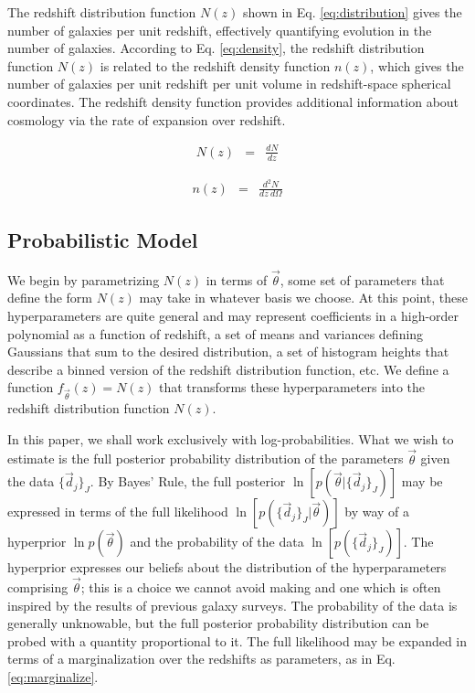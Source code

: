 \documentclass[preprint]{aastex}
\begin{document}
The redshift distribution function $N(z)$ shown in Eq. \ref{eq:distribution} 
gives the number of galaxies per unit redshift, effectively quantifying 
evolution in the number of galaxies.  \citep{Menard2013}  According to Eq. 
\ref{eq:density}, the redshift distribution function $N(z)$ is related to the 
redshift density function $n(z)$, which gives the number of galaxies per unit 
redshift per unit volume in redshift-space spherical coordinates.  The redshift 
density function provides additional information about cosmology via the rate 
of expansion over redshift.

\begin{eqnarray}
\label{eq:distribution}
N(z) &=& \frac{dN}{dz}
\end{eqnarray}

\begin{eqnarray}
\label{eq:density}
n(z) &=& \frac{d^{2}N}{dz\ d\Omega}
\end{eqnarray}

\clearpage
\subsection{Probabilistic Model}
\label{sec:prob}

We begin by parametrizing $N(z)$ in terms of $\vec{\theta}$, some set of 
parameters that define the form $N(z)$ may take in whatever basis we choose.  
At this point, these hyperparameters are quite general and may represent 
coefficients in a high-order polynomial as a function of redshift, a set of 
means and variances defining Gaussians that sum to the desired distribution, a 
set of histogram heights that describe a binned version of the redshift 
distribution function, etc.  We define a function $f_{\vec{\theta}}(z)=N(z)$ 
that transforms these hyperparameters into the redshift distribution function 
$N(z)$.

In this paper, we shall work exclusively with log-probabilities.  What we wish 
to estimate is the full posterior probability distribution of the parameters 
$\vec{\theta}$ given the data $\{\vec{d}_{j}\}_{J}$.  By Bayes' Rule, the full 
posterior $\ln[p(\vec{\theta}|\{\vec{d}_{j}\}_{J})]$ may be expressed in terms 
of the full likelihood $\ln[p(\{\vec{d}_{j}\}_{J}|\vec{\theta})]$ by way of a 
hyperprior $\ln p(\vec{\theta})$ and the probability of the data 
$\ln[p(\{\vec{d}_{j}\}_{J})]$.  The hyperprior expresses our beliefs about the 
distribution of the hyperparameters comprising $\vec{\theta}$; this is a choice 
we cannot avoid making and one which is often inspired by the results of 
previous galaxy surveys.  The probability of the data is generally unknowable, 
but the full posterior probability distribution can be probed with a quantity 
proportional to it.  The full likelihood may be expanded in terms of a 
marginalization over the redshifts as parameters, as in Eq. 
\ref{eq:marginalize}.  
\end{document}

